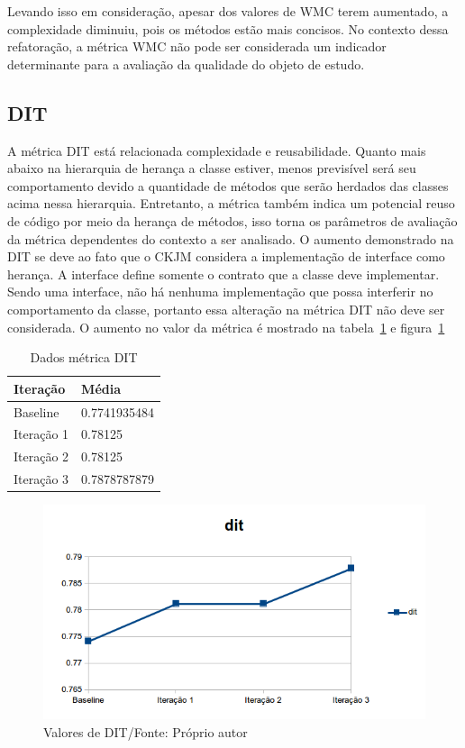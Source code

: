 Levando isso em consideração, apesar dos valores de WMC
terem aumentado, a complexidade diminuiu, pois os métodos estão mais concisos.
No contexto dessa refatoração, a métrica WMC não pode ser considerada um
indicador determinante para a avaliação da qualidade do objeto de estudo.


\subsection{DIT}

A métrica DIT está relacionada complexidade e reusabilidade. Quanto mais
abaixo na hierarquia de herança a classe estiver, menos previsível será seu
comportamento devido a quantidade de métodos que serão herdados das classes
acima nessa hierarquia. Entretanto, a métrica também indica um potencial reuso
de código por meio da herança de métodos, isso torna os parâmetros de avaliação
da métrica dependentes do contexto a ser analisado. O aumento demonstrado na DIT
se deve ao fato que o CKJM considera a implementação de interface como herança.
A interface define somente o contrato que a classe deve implementar. Sendo uma
interface, não há nenhuma implementação que possa interferir no comportamento
da classe, portanto essa alteração na métrica DIT não deve ser considerada. O
aumento no valor da métrica é mostrado na tabela~\ref{tab:dit} e
figura~\ref{fig:dit}

\begin{table}[!h]
	\centering
	    \caption{Dados métrica DIT}
    \begin{tabular}{ | l | l | }
    \hline
    Iteração & Média 			\\ \hline
    Baseline & 0.7741935484  	\\ \hline
    Iteração 1 & 0.78125		\\ \hline
	Iteração 2 & 0.78125			\\ \hline
	Iteração 3 & 0.7878787879	\\ \hline
    \end{tabular}
    \label{tab:dit}
\end{table}

\begin{figure}[!h]
	\centering
	\includegraphics{img/dit.png}
	\caption{Valores de DIT/Fonte: Próprio autor}
	\label{fig:dit}
\end{figure}


